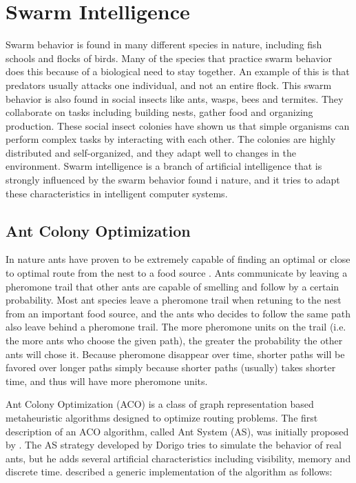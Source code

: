 \section{Swarm Intelligence}

Swarm behavior is found in many different species in nature, including fish schools and flocks of birds. Many of the species that practice swarm behavior does this because of a biological need to stay together. An example of this is that predators usually attacks one individual, and not an entire flock. This swarm behavior is also found in social insects like ants, wasps, bees and termites. They collaborate on tasks including building nests, gather food and organizing production. These social insect colonies have shown us that simple organisms can perform complex tasks by interacting with each other. The colonies are highly distributed and self-organized, and they adapt well to changes in the environment. Swarm intelligence \citep{beni89} is a branch of artificial intelligence that is strongly influenced by the swarm behavior found i nature, and it tries to adapt these characteristics in intelligent computer systems.

\subsection{Ant Colony Optimization}
In nature ants have proven to be extremely capable of finding an optimal or close to optimal route from the nest to a food source \citep{deneubourg90}. Ants communicate by leaving a pheromone trail that other ants are capable of smelling and follow by a certain probability. Most ant species leave a pheromone trail when retuning to the nest from an important food source, and the ants who decides to follow the same path also leave behind a pheromone trail. The more pheromone units on the trail (i.e. the more ants who choose the given path), the greater the probability the other ants will chose it. Because pheromone disappear over time, shorter paths will be favored over longer paths simply because shorter paths (usually) takes shorter time, and thus will have more pheromone units. 

Ant Colony Optimization (ACO) is a class of graph representation based metaheuristic algorithms designed to optimize routing problems. The first description of an ACO algorithm, called Ant System (AS), was initially proposed by \citet{dorigo96}. The AS strategy developed by Dorigo tries to simulate the behavior of real ants, but he adds several artificial characteristics including visibility, memory and discrete time. \citet{nanda11} described a generic implementation of the algorithm as follows: \\

